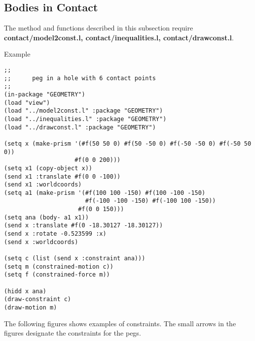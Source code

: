 \subsection{\label{Contact}Bodies in Contact}

The method and functions described in this subsection require
{\bf contact/model2const.l, con\-tact/in\-e\-qual\-i\-ties.l,
 contact/drawconst.l}.

\begin{refdesc}





\end{refdesc}

Example\\
\begin{verbatim}
;;
;;      peg in a hole with 6 contact points
;;
(in-package "GEOMETRY")
(load "view")
(load "../model2const.l" :package "GEOMETRY")
(load "../inequalities.l" :package "GEOMETRY")
(load "../drawconst.l" :package "GEOMETRY")

(setq x (make-prism '(#f(50 50 0) #f(50 -50 0) #f(-50 -50 0) #f(-50 50 0))
                    #f(0 0 200)))
(setq x1 (copy-object x))
(send x1 :translate #f(0 0 -100))
(send x1 :worldcoords)
(setq a1 (make-prism '(#f(100 100 -150) #f(100 -100 -150)
                       #f(-100 -100 -150) #f(-100 100 -150))
                     #f(0 0 150)))
(setq ana (body- a1 x1))
(send x :translate #f(0 -18.30127 -18.30127))
(send x :rotate -0.523599 :x)
(send x :worldcoords)

(setq c (list (send x :constraint ana)))
(setq m (constrained-motion c))
(setq f (constrained-force m))

(hidd x ana)
(draw-constraint c)
(draw-motion m)
\end{verbatim}
\clearpage
The following figures shows examples of constraints.
The small arrows in the figures designate the constraints for the pegs.
\\ 


